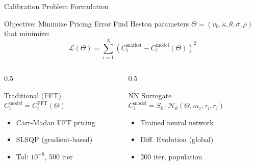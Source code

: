 \documentclass{beamer}
\begin{document}
\begin{frame}{Calibration Problem Formulation}
    \begin{block}{Objective: Minimize Pricing Error}
        Find Heston parameters $\Theta = (v_0, \kappa, \theta, \sigma, \rho)$ that minimize:
        \begin{equation}
            \mathcal{L}(\Theta) = \sum_{i=1}^N \left(C_i^{\text{market}} - C_i^{\text{model}}(\Theta)\right)^2
        \end{equation}
    \end{block}

    \vspace{0.2cm}

    \begin{columns}
        \begin{column}{0.5\textwidth}
            \begin{block}{Traditional (FFT)}
                $C_i^{\text{model}} = C_i^{\text{FFT}}(\Theta)$
                \begin{itemize}
                    \item Carr-Madan FFT pricing
                    \item SLSQP (gradient-based)
                    \item Tol: $10^{-8}$, 500 iter
                \end{itemize}
            \end{block}
        \end{column}
        \begin{column}{0.5\textwidth}
            \begin{block}{NN Surrogate}
                $C_i^{\text{model}} = S_0 \cdot \mathcal{N}_\theta(\Theta, m_i, \tau_i, r_i)$
                \begin{itemize}
                    \item Trained neural network
                    \item Diff. Evolution (global)
                    \item 200 iter, population
                \end{itemize}
            \end{block}
        \end{column}
    \end{columns}
\end{frame}
\end{document}

